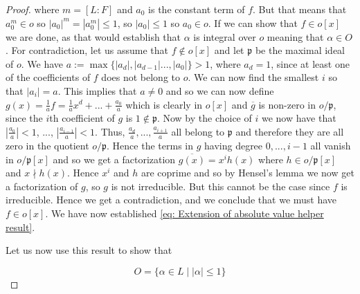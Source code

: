 \documentclass{article}
\newcommand{\mfrak}[1]{\mathfrak{#1}}
\begin{document}
\begin{proof}
    where $m = [L : F]$ and $a_0$ is the constant term of $f$. But that means that $a_0^m \in o$ so $|a_0|^m = |a_0^m| \leq 1$, so $|a_0| \leq 1$ so $a_0 \in o$. If we can show that $f \in o[x]$ we are done, as that would establish that $\alpha$ is integral over $o$ meaning that $\alpha \in O$. For contradiction, let us assume that $f \notin o[x]$ and let $\mfrak p$ be the maximal ideal of $o$. We have $a := \max\{|a_d|, |a_{d-1}| ..., |a_0| \} > 1$, where $a_d = 1$, since at least one of the coefficients of $f$ does not belong to $o$. We can now find the smallest $i$ so that $|a_i| = a$. This implies that $a \neq 0$ and so we can now define $g(x) = \frac{1}{a}f = \frac{1}{a}x^d + ... + \frac{a_0}{a}$ which is clearly in $o[x]$ and $\overline g$ is non-zero in $o/\mfrak p$, since the $i$th coefficient of $g$ is $1 \notin \mfrak p$. Now by the choice of $i$ we now have that $|\frac{a_0}{a}| < 1$, ..., $|\frac{a_{i-1}}{a}| < 1$. Thus, $\frac{a_d}{a}, ..., \frac{a_{i+1}}{a}$ all belong to $\mfrak p$ and therefore they are all zero in the quotient $o/\mfrak p$. Hence the terms in $g$ having degree $0, ..., i-1$ all vanish in $o/\mfrak p[x]$ and so we get a factorization $\overline {g(x)} = x^i h(x)$ where $h \in o/\mfrak p[x]$ and $x \nmid h(x)$. Hence $x^i$ and $h$ are coprime and so by Hensel's lemma we now get a factorization of $g$, so $g$ is not irreducible. But this cannot be the case since $f$ is irreducible. Hence we get a contradiction, and we conclude that we must have $f \in o[x]$. We have now established \cref{eq: Extension of absolute value helper result}.


    
    
    Let us now use this result to show that 
    
    $$O = \{\alpha \in L \mid |\alpha| \leq 1  \}$$
    

\end{proof}
\end{document}
